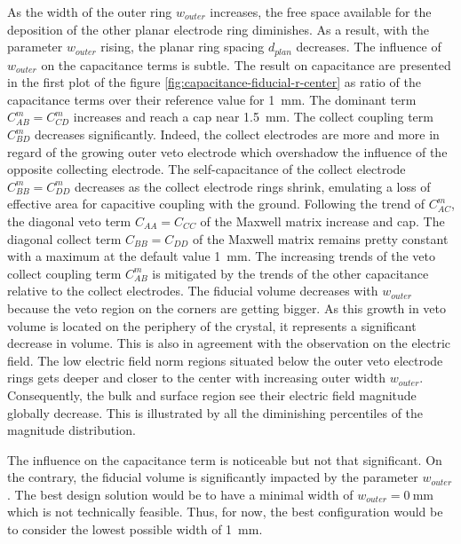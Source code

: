 As the width of the outer ring $w_{outer}$ increases, the free space available for the deposition of the other planar electrode ring diminishes. As a result, with the parameter $w_{outer}$ rising, the planar ring spacing $d_{plan}$ decreases.
The influence of $w_{outer}$ on the capacitance terms is subtle. The result on capacitance are presented in the first plot of the figure \ref{fig:capacitance-fiducial-r-center} as ratio of the capacitance terms over their reference value for \SI{1}{\mm}. The dominant term $C_{AB}^m=C_{CD}^m$ increases and reach a cap near \SI{1.5}{\mm}. The collect coupling term $C_{BD}^m$ decreases significantly.  Indeed, the collect electrodes are more and more in regard of the growing outer veto electrode which overshadow the influence of the opposite collecting electrode. The self-capacitance of the collect electrode $C_{BB}^m=C_{DD}^m$ decreases as the collect electrode rings shrink, emulating a loss of effective area for capacitive coupling with the ground. Following the trend of $C_{AC}^m$, the diagonal veto term $C_{AA} = C_{CC}$ of the Maxwell matrix increase and cap. The diagonal collect term $C_{BB} = C_{DD}$ of the Maxwell matrix remains pretty constant with a maximum at the default value \SI{1}{\mm}. The increasing trends of the veto collect coupling term $C_{AB}^m$ is mitigated by the trends of the other capacitance relative to the collect electrodes.
The fiducial volume decreases with $w_{outer}$ because the veto region on the corners are getting bigger. As this growth in veto volume is located on the periphery of the crystal, it represents a significant decrease in volume.
This is also in agreement with the observation on the electric field. The low electric field norm regions situated below the outer veto electrode rings gets deeper and closer to the center with increasing outer width $w_{outer}$. Consequently, the bulk and surface region see their electric field magnitude globally decrease. This is illustrated by all the diminishing percentiles of the magnitude distribution. 

The influence on the capacitance term is noticeable but not that significant. On the contrary, the fiducial volume is significantly impacted by the parameter $w_{outer}$. The best design solution would be to have a minimal width of $w_{outer}=\SI{0}{\mm}$ which is not technically feasible. Thus, for now, the best configuration would be to consider the lowest possible width of \SI{1}{\mm}.


